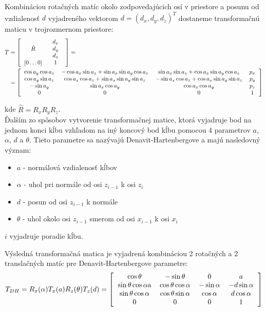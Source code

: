 Kombináciou rotačných matíc okolo zodpovedajúcich osí v priestore a posunu od vzdialenosť $d$ vyjadreného vektorom $d=(d_x, d_y, d_z)^T$ dostaneme transformačnú maticu v trojrozmernom priestore:
\footnotesize
\begin{align}
   T&=\left[
	\begin{tabular}{cc}
		$\hat{R}$ & 
			\begin{tabular}{c}
				$d_x$ \\
				$d_y$ \\
				$d_z$
			\end{tabular} \\
		$[0\ldots0]$ & 1
	\end{tabular}
	\right] = \nonumber \\
	&=\left[
	\begin{tabular}{cccc}
		$\cos a_y \cos a_z$ & $-\cos a_x \sin a_z + \sin a_x \sin a_y \cos a_z$ & $\sin a_x \sin a_z + \cos a_x  \sin a_y \cos a_z$ & $p_x$ \\
		$\cos a_y \sin a_z$ & $\cos a_x \cos a_z + \sin a_x \sin a_y \sin a_z$ & $-\sin a_x \cos a_z + \cos a_x \sin a_y \sin a_z$ & $p_y$ \\
		$-\sin a_y$ & $\sin a_x \cos a_y$ & $\cos a_x \cos a_y$ & $p_z$ \\
		0 & 0 & 0 & 1
	\end{tabular}
	\right]
\end{align}

\normalsize
kde $\hat{R} = R_xR_yR_z$.
\\

Ďalším zo spôsobov vytvorenie transformačnej matice, ktorá vyjadruje bod na jednom konci kĺbu vzhľadom na iný koncový bod kĺbu pomocou 4 parametrov $a$, $\alpha$, $d$ a $\theta$. Tieto parametre sa nazývajú Denavit-Hartenbergove a majú nasledovný význam:
\begin{itemize}
	\item $a$ - normálová vzdialenosť kĺbov
	\item $\alpha$ - uhol pri normále od osi $z_{i-1}$ k osi $z_i$
	\item $d$ - posun od osi $z_{i-1}$ k normále
	\item $\theta$ - uhol okolo osi $z_{i-1}$ smerom od osi $x_{i-1}$ k osi $x_i$
\end{itemize}
$i$ vyjadruje poradie kĺbu.

Výsledná transformačná matica je vyjadrená kombináciou 2 rotačných a 2 translačných matíc pre Denavit-Hartenbergove parametre:
\begin{equation}
	T_{DH} = R_x(\alpha)T_x(a)R_z(\theta)T_z(d) =
	\left[
	\begin{tabular}{cccc}
		$\cos \theta$ & $-\sin \theta$ & $0$ & $a$ \\
		$\sin\theta\cos\alpha$a & $\cos\theta\cos\alpha$ & $-\sin\alpha$ & $-d\sin\alpha$ \\
		$\sin\theta\cos\alpha$ & $\cos\theta\sin\alpha$ & $\cos\alpha$ & $d\cos\alpha$ \\
		$0$ & $0$ & $0$ & $1$
	\end{tabular}
	\right]
\end{equation}

